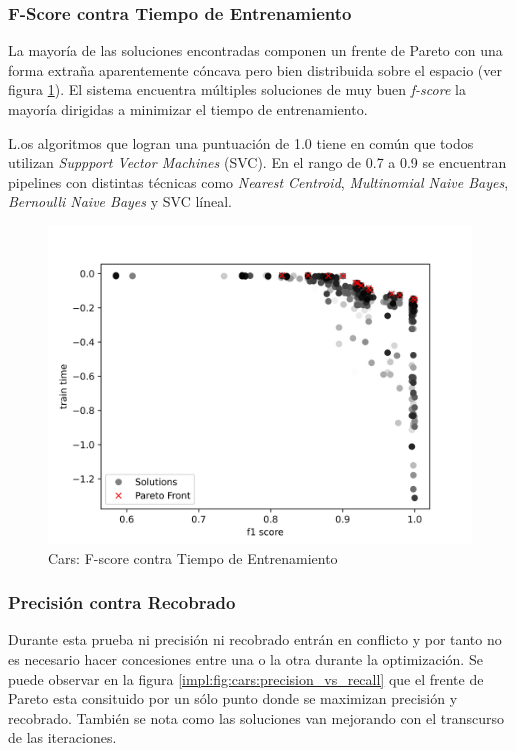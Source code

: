 \subsubsection{F-Score contra Tiempo de Entrenamiento}
La mayor\'ia de las soluciones encontradas componen un frente de Pareto con una forma extra\~na aparentemente c\'oncava pero bien distribuida sobre el espacio (ver figura \ref{impl:fig:cars:fscore_vs_time}).  El sistema encuentra  m\'ultiples soluciones de muy buen \textit{f-score} la mayor\'ia dirigidas a minimizar el tiempo de entrenamiento. 

L.os algoritmos que logran una puntuaci\'on de 1.0 tiene en com\'un que todos utilizan \textit{Suppport Vector Machines} (SVC). En el rango de 0.7 a 0.9 se encuentran pipelines con distintas t\'ecnicas como \textit{Nearest Centroid}, \textit{Multinomial Naive Bayes}, \textit{Bernoulli Naive Bayes} y SVC l\'ineal.

\begin{figure}[ht]
    \centering
    \includegraphics[scale=0.65]{Pictures/cars_fscore_vs_time.jpg}
    \caption{Cars: F-score contra Tiempo de Entrenamiento}
    \label{impl:fig:cars:fscore_vs_time}
\end{figure}


\subsubsection{Precisi\'on contra Recobrado}
Durante esta prueba  ni precisi\'on ni recobrado entr\'an en conflicto y por tanto no es necesario hacer concesiones entre una o la otra durante la optimizaci\'on. Se puede observar en la figura \ref{impl:fig:cars:precision_vs_recall} que el frente de Pareto esta consituido por un s\'olo punto donde se maximizan precisi\'on y recobrado. Tambi\'en se nota como las soluciones van mejorando con el transcurso de las iteraciones.


